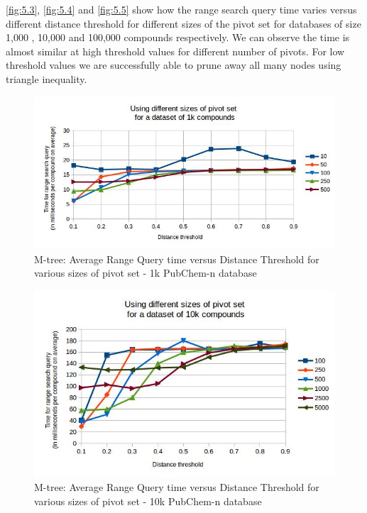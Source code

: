 \autoref{fig:5.3}, \autoref{fig:5.4} and \autoref{fig:5.5} show how the range search query time varies versus different distance threshold for different sizes of the pivot set for databases of size 1,000 , 10,000 and 100,000 compounds respectively. We can observe the time is almost similar at high threshold values for different number of pivots. For low threshold values we are successfully able to prune away all many nodes using triangle inequality. 


\begin{figure}[ht!]	
\centering
\includegraphics[width=1 \columnwidth]{img/image2.jpg}
\caption{M-tree: Average Range Query time versus Distance Threshold for various sizes of pivot set - 1k PubChem-n database}
\label{fig:5.3}
\end{figure}


\begin{figure}[ht!]	
\centering
\includegraphics[width=1 \columnwidth]{img/image3.jpg}
\caption{M-tree: Average Range Query time versus Distance Threshold for various sizes of pivot set - 10k PubChem-n database}
\label{fig:5.4}
\end{figure}



